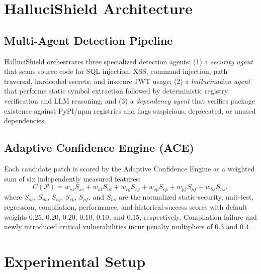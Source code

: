 \documentclass[conference]{IEEEtran}
\begin{document}
\section{HalluciShield Architecture}
\label{sec:architecture}

\subsection{Multi-Agent Detection Pipeline}
HalluciShield orchestrates three specialized detection agents:
(1) a \emph{security agent} that scans source code for SQL injection, XSS,
command injection, path traversal, hardcoded secrets, and insecure JWT usage;
(2) a \emph{hallucination agent} that performs static symbol extraction
followed by deterministic registry verification and LLM reasoning; and
(3) a \emph{dependency agent} that verifies package existence against PyPI/npm
registries and flags suspicious, deprecated, or unused dependencies.

\subsection{Adaptive Confidence Engine (ACE)}
Each candidate patch is scored by the Adaptive Confidence Engine as a
weighted sum of six independently measured features:
%
\begin{equation}
C(\mathcal{P}) =
w_{ss} S_{ss} + w_{ut} S_{ut} + w_{rg} S_{rg} + w_{cp} S_{cp}
+ w_{pf} S_{pf} + w_{hs} S_{hs},
\label{eq:ace}
\end{equation}
%
where $S_{ss}$, $S_{ut}$, $S_{rg}$, $S_{cp}$, $S_{pf}$, and $S_{hs}$ are the
normalized static-security, unit-test, regression, compilation, performance,
and historical-success scores with default weights
$0.25$, $0.20$, $0.20$, $0.10$, $0.10$, and $0.15$, respectively.
Compilation failure and newly introduced critical vulnerabilities incur
penalty multipliers of $0.3$ and $0.4$.

\section{Experimental Setup}
\label{sec:setup}
\end{document}
